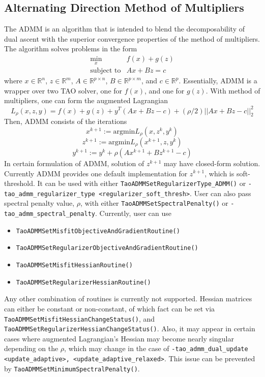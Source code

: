 \documentclass[]{book}
\newcommand{\R}{\mathbb R}
\renewcommand{\Re}{\R}
\begin{document}
\subsection{Alternating Direction Method of Multipliers}

The ADMM is an algorithm that is intended to blend the decomposability
of dual ascent with the superior convergence properties of the
method of multipliers. \cite{boyd} 
The algorithm solves problems in the form
\[
\begin{array}{ll}
\displaystyle \min_{x} & f(x) + g(z) \\ 
\mbox{subject to} & Ax + Bz = c
\end{array}
\]
where $x \in \Re^n$, $z \in \Re^m$, $A \in \Re^{p \times n}$, $B \in \Re^{p \times m}$, and $c \in \Re^p$.
Essentially, ADMM is a wrapper over two TAO solver, one for $f(x)$, and one for $g(z)$.
With method of multipliers, one can form the augmented Lagrangian 
\begin{equation}
L_{\rho}(x,z,y) = f(x) + g(z) + y^T(Ax+Bz-c) + (\rho/2)||Ax+Bz-c||_2^2
\end{equation}
Then, ADMM consists of the iterations
\begin{equation}
x^{k+1} := \text{argmin}L_{\rho}(x,z^k,y^k)
\end{equation}
\begin{equation}
z^{k+1} := \text{argmin}L_{\rho}(x^{k+1},z,y^k)
\end{equation}
\begin{equation}
y^{k+1} := y^k + \rho(Ax^{k+1}+Bz^{k+1}-c)
\end{equation}
In certain formulation of ADMM, solution of $z^{k+1}$ may have closed-form solution. 
Currently ADMM provides one default implementation for $z^{k+1}$, which is soft-threshold. 
It can be used with either {\tt TaoADMMSetRegularizerType\_ADMM()} or
\texttt{-tao\_admm\_regularizer\_type <regularizer\_soft\_thresh>}.
User can also pass spectral penalty value, $\rho$, with either {\tt TaoADMMSetSpectralPenalty()} or
\texttt{-tao\_admm\_spectral\_penalty}.
Currently, user can use
\begin{itemize}
\item {\tt TaoADMMSetMisfitObjectiveAndGradientRoutine()}
\item {\tt TaoADMMSetRegularizerObjectiveAndGradientRoutine()}
\item {\tt TaoADMMSetMisfitHessianRoutine()}
\item {\tt TaoADMMSetRegularizerHessianRoutine()}
\end{itemize}
Any other combination of routines is currently not supported. Hessian matrices can either be constant or non-constant,
of which fact can be set via {\tt TaoADMMSetMisfitHessianChangeStatus()}, and {\tt TaoADMMSetRegularizerHessianChangeStatus()}.
Also, it may appear in certain cases where augmented Lagrangian's Hessian may become nearly singular depending on the 
$\rho$, which may change in the case of \texttt{-tao\_admm\_dual\_update <update\_adaptive>, <update\_adaptive\_relaxed>}.
This issue can be prevented by {\tt TaoADMMSetMinimumSpectralPenalty()}.
\end{document}
